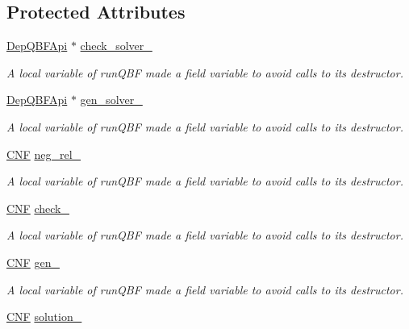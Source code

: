 \subsection*{Protected Attributes}
\begin{DoxyCompactItemize}
\item 
\hyperlink{classDepQBFApi}{Dep\-Q\-B\-F\-Api} $\ast$ \hyperlink{classParExtractorQBFWorker_a502e2ad2571150e5163521f24ad7ed44}{check\-\_\-solver\-\_\-}
\begin{DoxyCompactList}\small\item\em A local variable of run\-Q\-B\-F made a field variable to avoid calls to its destructor. \end{DoxyCompactList}\item 
\hyperlink{classDepQBFApi}{Dep\-Q\-B\-F\-Api} $\ast$ \hyperlink{classParExtractorQBFWorker_a8e1ba62520402318260a1a0fa4aff522}{gen\-\_\-solver\-\_\-}
\begin{DoxyCompactList}\small\item\em A local variable of run\-Q\-B\-F made a field variable to avoid calls to its destructor. \end{DoxyCompactList}\item 
\hyperlink{classCNF}{C\-N\-F} \hyperlink{classParExtractorQBFWorker_a02c79f381699aa1a1ee4c587de800519}{neg\-\_\-rel\-\_\-}
\begin{DoxyCompactList}\small\item\em A local variable of run\-Q\-B\-F made a field variable to avoid calls to its destructor. \end{DoxyCompactList}\item 
\hyperlink{classCNF}{C\-N\-F} \hyperlink{classParExtractorQBFWorker_a062f6a65b3c42b1077cc8438b067fe03}{check\-\_\-}
\begin{DoxyCompactList}\small\item\em A local variable of run\-Q\-B\-F made a field variable to avoid calls to its destructor. \end{DoxyCompactList}\item 
\hyperlink{classCNF}{C\-N\-F} \hyperlink{classParExtractorQBFWorker_adf9fdc0ec3d272476e6a290fbf3c3b6b}{gen\-\_\-}
\begin{DoxyCompactList}\small\item\em A local variable of run\-Q\-B\-F made a field variable to avoid calls to its destructor. \end{DoxyCompactList}\item 
\hyperlink{classCNF}{C\-N\-F} \hyperlink{classParExtractorQBFWorker_a61deac4da5bb39dfd73e81d8be25559e}{solution\-\_\-}

\end{DoxyCompactItemize}

